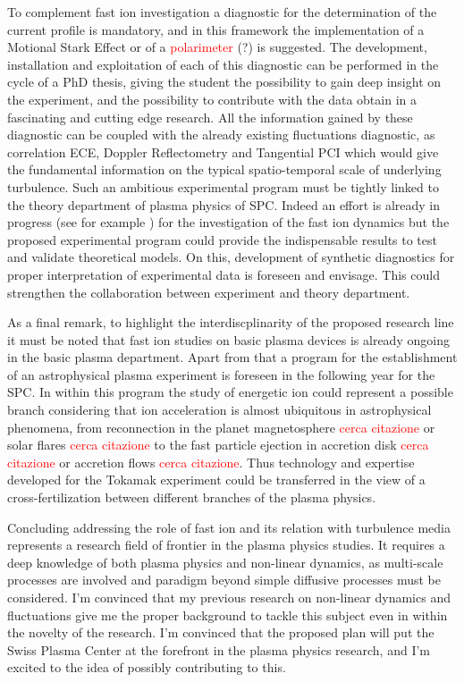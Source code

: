 \documentclass[12pt,a4paper]{article}
\begin{document}
To complement fast ion investigation a diagnostic for the
determination of the current profile is mandatory, and in this
framework the implementation of a Motional Stark Effect or of a
\textcolor{red}{polarimeter} (?) is suggested.
The development, installation and exploitation of each of this
diagnostic can be performed in the cycle of a PhD thesis, giving the
student the possibility to gain deep insight on the experiment, and
the possibility to contribute with the data obtain in a fascinating
and cutting edge research. All the information gained by these
diagnostic can be coupled with the already existing fluctuations
diagnostic, as correlation ECE, Doppler Reflectometry and Tangential
PCI which would give the fundamental information on the typical
spatio-temporal scale of underlying turbulence. Such an ambitious
experimental program must be tightly linked to the theory department
of plasma physics of SPC. Indeed an effort is already in progress (see
for example \cite{Albergante:2011bj,Pfefferle:2014bk}) for
the investigation of the fast ion dynamics but the proposed
experimental program could provide the indispensable results to test
and validate theoretical models. On this,  development of synthetic
diagnostics for proper interpretation of experimental data is foreseen
and envisage. This could strengthen the collaboration between
experiment and theory department. 

As a final remark, to highlight the interdiscplinarity of the proposed
research line it must be noted that fast ion studies on basic
plasma devices is already ongoing in the basic plasma
department. Apart from that a program for the establishment of an
astrophysical plasma experiment is foreseen in the following year for
the SPC. In
within this program the study of energetic ion could represent a
possible branch considering that ion acceleration is almost ubiquitous in
astrophysical phenomena,  from reconnection in the planet
magnetosphere \textcolor{red}{cerca citazione} or solar flares
\textcolor{red}{cerca citazione} to the fast particle
ejection in accretion disk \textcolor{red}{cerca citazione} or
accretion flows \textcolor{red}{cerca citazione}. Thus
technology and expertise developed for the Tokamak experiment could be
transferred in the view of a cross-fertilization between different
branches of the plasma physics.

Concluding addressing the role of fast ion and its relation with
turbulence media represents a research field of frontier in the
plasma physics studies. It requires a deep knowledge of both plasma
physics and non-linear dynamics, as multi-scale processes are involved
and paradigm beyond simple diffusive processes must be considered. I'm
convinced that my previous research on non-linear dynamics and
fluctuations give me the proper background to tackle this
subject even in within the novelty of the research. I'm convinced that
the proposed plan will put the Swiss Plasma Center at the forefront in
the plasma physics research, and I'm excited to the idea of possibly
contributing to this.
\clearpage
\printbibliography[title=Personal publications cited,notkeyword=others, prefixnumbers={A}, resetnumbers=true]
\printbibliography[title=Other Sources, keyword=others, prefixnumbers={B}, resetnumbers=true]
\end{document}
